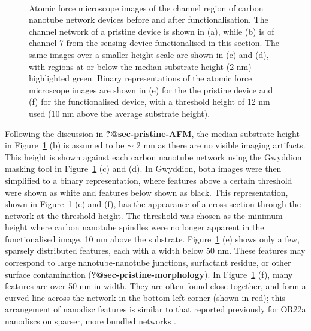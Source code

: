 \documentclass[
  a4paper,
]{scrbook}
\begin{document}
\begin{figure}
\begin{minipage}[t]{0.01\linewidth}
{\centering 

~

}

\end{minipage}%

\caption{\label{fig-working-OR22a-AFM}Atomic force microscope images of
the channel region of carbon nanotube network devices before and after
functionalisation. The channel network of a pristine device is shown in
(a), while (b) is of channel 7 from the sensing device functionalised in
this section. The same images over a smaller height scale are shown in
(c) and (d), with regions at or below the median substrate height (2 nm)
highlighted green. Binary representations of the atomic force microscope
images are shown in (e) for the the pristine device and (f) for the
functionalised device, with a threshold height of 12 nm used (10 nm
above the average substrate height).}

\end{figure}

Following the discussion in \textbf{?@sec-pristine-AFM}, the median
substrate height in Figure~\ref{fig-working-OR22a-AFM} (b) is assumed to
be \(\sim\) 2 nm as there are no visible imaging artifacts. This height
is shown against each carbon nanotube network using the Gwyddion masking
tool in Figure~\ref{fig-working-OR22a-AFM} (c) and (d). In Gwyddion,
both images were then simplified to a binary representation, where
features above a certain threshold were shown as white and features
below shown as black. This representation, shown in
Figure~\ref{fig-working-OR22a-AFM} (e) and (f), has the appearance of a
cross-section through the network at the threshold height. The threshold
was chosen as the minimum height where carbon nanotube spindles were no
longer apparent in the functionalised image, 10 nm above the substrate.
Figure~\ref{fig-working-OR22a-AFM} (e) shows only a few, sparsely
distributed features, each with a width below 50 nm. These features may
correspond to large nanotube-nanotube junctions, surfactant residue, or
other surface contamination (\textbf{?@sec-pristine-morphology}). In
Figure~\ref{fig-working-OR22a-AFM} (f), many features are over 50 nm in
width. They are often found close together, and form a curved line
across the network in the bottom left corner (shown in red); this
arrangement of nanodisc features is similar to that reported previously
for OR22a nanodiscs on sparser, more bundled networks
\autocite{Murugathas2019a}.
\end{document}
